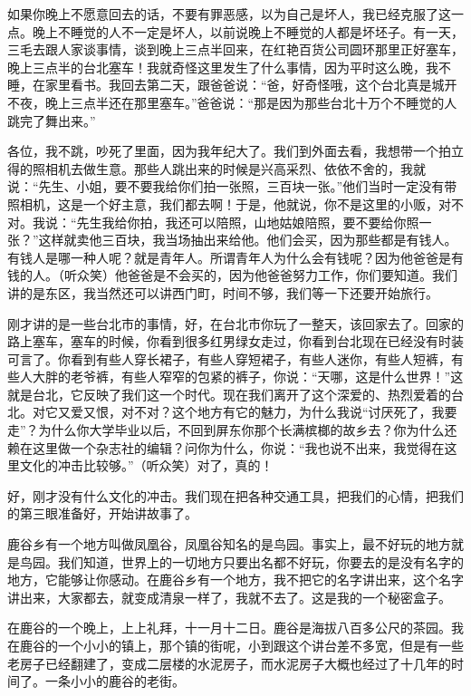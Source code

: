 \par 如果你晚上不愿意回去的话，不要有罪恶感，以为自己是坏人，我已经克服了这一点。晚上不睡觉的人不一定是坏人，以前说晚上不睡觉的人都是坏坯子。有一天，三毛去跟人家谈事情，谈到晚上三点半回来，在红艳百货公司圆环那里正好塞车，晚上三点半的台北塞车！我就奇怪这里发生了什么事情，因为平时这么晚，我不睡，在家里看书。我回去第二天，跟爸爸说：“爸，好奇怪哦，这个台北真是城开不夜，晚上三点半还在那里塞车。”爸爸说：“那是因为那些台北十万个不睡觉的人跳完了舞出来。”
\par 各位，我不跳，吵死了里面，因为我年纪大了。我们到外面去看，我想带一个拍立得的照相机去做生意。那些人跳出来的时候是兴高采烈、依依不舍的，我就说：“先生、小姐，要不要我给你们拍一张照，三百块一张。”他们当时一定没有带照相机，这是一个好主意，我们都去啊！于是，他就说，你不是这里的小贩，对不对。我说：“先生我给你拍，我还可以陪照，山地姑娘陪照，要不要给你照一张？”这样就卖他三百块，我当场抽出来给他。他们会买，因为那些都是有钱人。有钱人是哪一种人呢？就是青年人。所谓青年人为什么会有钱呢？因为他爸爸是有钱的人。（听众笑）他爸爸是不会买的，因为他爸爸努力工作，你们要知道。我们讲的是东区，我当然还可以讲西门町，时间不够，我们等一下还要开始旅行。
\par 刚才讲的是一些台北市的事情，好，在台北市你玩了一整天，该回家去了。回家的路上塞车，塞车的时候，你看到很多红男绿女走过，你看到台北现在已经没有时装可言了。你看到有些人穿长裙子，有些人穿短裙子，有些人迷你，有些人短裤，有些人大胖的老爷裤，有些人窄窄的包紧的裤子，你说：“天哪，这是什么世界！”这就是台北，它反映了我们这一个时代。现在我们离开了这个深爱的、热烈爱着的台北。对它又爱又恨，对不对？这个地方有它的魅力，为什么我说“讨厌死了，我要走”？为什么你大学毕业以后，不回到屏东你那个长满槟榔的故乡去？你为什么还赖在这里做一个杂志社的编辑？问你为什么，你说：“我也说不出来，我觉得在这里文化的冲击比较够。”（听众笑）对了，真的！
\par 好，刚才没有什么文化的冲击。我们现在把各种交通工具，把我们的心情，把我们的第三眼准备好，开始讲故事了。
\par 鹿谷乡有一个地方叫做凤凰谷，凤凰谷知名的是鸟园。事实上，最不好玩的地方就是鸟园。我们知道，世界上的一切地方只要出名都不好玩，你要去的是没有名字的地方，它能够让你感动。在鹿谷乡有一个地方，我不把它的名字讲出来，这个名字讲出来，大家都去，就变成清泉一样了，我就不去了。这是我的一个秘密盒子。
\par 在鹿谷的一个晚上，上上礼拜，十一月十二日。鹿谷是海拔八百多公尺的茶园。我在鹿谷的一个小小的镇上，那个镇的街呢，小到跟这个讲台差不多宽，但是有一些老房子已经翻建了，变成二层楼的水泥房子，而水泥房子大概也经过了十几年的时间了。一条小小的鹿谷的老街。
